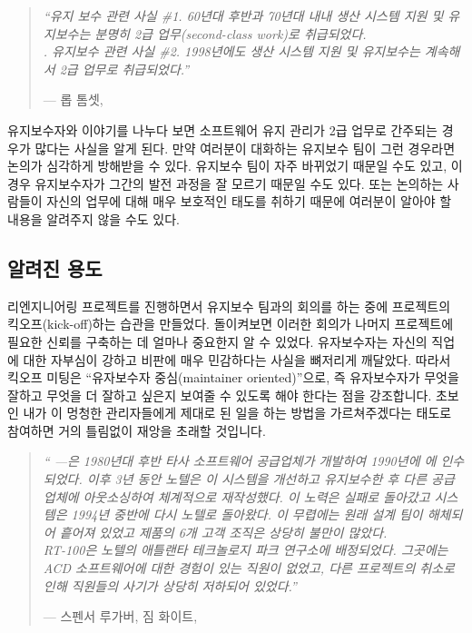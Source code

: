 \documentclass[a4paper,10pt,twoside]{book}
\begin{document}
\begin{quotation}
\noindent
\emph{``유지 보수 관련 사실 \#1. 60년대 후반과 70년대 내내 생산 시스템 지원 및 유지보수는 분명히 2급 업무(second-class work)로 취급되었다.\\.
유지보수 관련 사실 \#2. 1998년에도 생산 시스템 지원 및 유지보수는 계속해서 2급 업무로 취급되었다.''}

\hfill --- 롭 톰셋, \cite{Thom98a}
\end{quotation}

유지보수자와 이야기를 나누다 보면 소프트웨어 유지 관리가 2급 업무로 간주되는 경우가 많다는 사실을 알게 된다. 만약 여러분이 대화하는 유지보수 팀이 그런 경우라면 논의가 심각하게 방해받을 수 있다. 유지보수 팀이 자주 바뀌었기 때문일 수도 있고, 이 경우 유지보수자가 그간의 발전 과정을 잘 모르기 때문일 수도 있다. 또는 논의하는 사람들이 자신의 업무에 대해 매우 보호적인 태도를 취하기 때문에 여러분이 알아야 할 내용을 알려주지 않을 수도 있다. 

\subsection*{알려진 용도}

리엔지니어링 프로젝트를 진행하면서 유지보수 팀과의 회의를 하는 중에 프로젝트의 킥오프(kick-off)하는 습관을 만들었다. 돌이켜보면 이러한 회의가 나머지 프로젝트에 필요한 신뢰를 구축하는 데 얼마나 중요한지 알 수 있었다. 유자보수자는 자신의 직업에 대한 자부심이 강하고 비판에 매우 민감하다는 사실을 뼈저리게 깨달았다. 따라서 킥오프 미팅은 ``유자보수자 중심(maintainer oriented)''으로, 즉 유자보수자가 무엇을 잘하고 무엇을 더 잘하고 싶은지 보여줄 수 있도록 해야 한다는 점을 강조합니다. 초보인 내가 이 멍청한 관리자들에게 제대로 된 일을 하는 방법을 가르쳐주겠다는 태도로 참여하면 거의 틀림없이 재앙을 초래할 것입니다.

\begin{quotation}
\noindent
\emph{`` ---은 1980년대 후반 타사 소프트웨어 공급업체가 개발하여 1990년에 에 인수되었다. 이후 3년 동안 노텔은 이 시스템을 개선하고 유지보수한 후 다른 공급업체에 아웃소싱하여 체계적으로 재작성했다. 이 노력은 실패로 돌아갔고 시스템은 1994년 중반에 다시 노텔로 돌아왔다. 이 무렵에는 원래 설계 팀이 해체되어 흩어져 있었고 제품의 6개 고객 조직은 상당히 불만이 많았다.\\
RT-100은 노텔의 애틀랜타 테크놀로지 파크 연구소에 배정되었다. 그곳에는 ACD 소프트웨어에 대한 경험이 있는 직원이 없었고, 다른 프로젝트의 취소로 인해 직원들의 사기가 상당히 저하되어 있었다.''}

\hfill --- 스펜서 루가버, 짐 화이트, \cite{Ruga98a}
\end{quotation}
\end{document}
